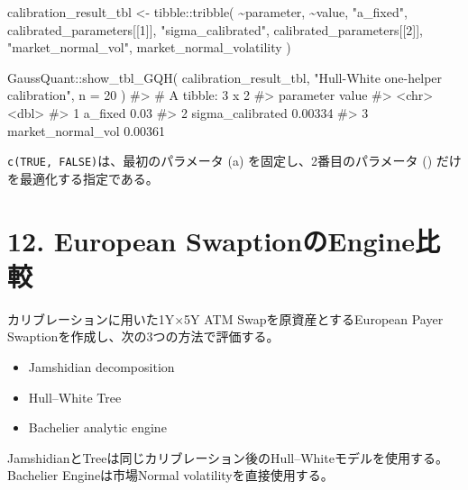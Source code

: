 \documentclass[
  letterpaper,
  DIV=11,
  numbers=noendperiod]{scrreprt}
\newenvironment{Shaded}{\begin{snugshade}}{\end{snugshade}}
\newcommand{\AttributeTok}[1]{\textcolor[rgb]{0.40,0.45,0.13}{#1}}
\newcommand{\CommentTok}[1]{\textcolor[rgb]{0.37,0.37,0.37}{#1}}
\newcommand{\DecValTok}[1]{\textcolor[rgb]{0.68,0.00,0.00}{#1}}
\newcommand{\FunctionTok}[1]{\textcolor[rgb]{0.28,0.35,0.67}{#1}}
\newcommand{\NormalTok}[1]{\textcolor[rgb]{0.00,0.23,0.31}{#1}}
\newcommand{\OtherTok}[1]{\textcolor[rgb]{0.00,0.23,0.31}{#1}}
\newcommand{\SpecialCharTok}[1]{\textcolor[rgb]{0.37,0.37,0.37}{#1}}
\newcommand{\StringTok}[1]{\textcolor[rgb]{0.13,0.47,0.30}{#1}}
\providecommand{\tightlist}{%
  \setlength{\itemsep}{0pt}\setlength{\parskip}{0pt}}
\begin{document}
\begin{Shaded}
\begin{Highlighting}[]
\NormalTok{calibration\_result\_tbl }\OtherTok{\textless{}{-}}\NormalTok{ tibble}\SpecialCharTok{::}\FunctionTok{tribble}\NormalTok{(}
  \SpecialCharTok{\textasciitilde{}}\NormalTok{parameter,             }\SpecialCharTok{\textasciitilde{}}\NormalTok{value,}
  \StringTok{"a\_fixed"}\NormalTok{,               calibrated\_parameters[[}\DecValTok{1}\NormalTok{]],}
  \StringTok{"sigma\_calibrated"}\NormalTok{,      calibrated\_parameters[[}\DecValTok{2}\NormalTok{]],}
  \StringTok{"market\_normal\_vol"}\NormalTok{,     market\_normal\_volatility}
\NormalTok{)}

\NormalTok{GaussQuant}\SpecialCharTok{::}\FunctionTok{show\_tbl\_GQH}\NormalTok{(}
\NormalTok{  calibration\_result\_tbl,}
  \StringTok{"Hull{-}White one{-}helper calibration"}\NormalTok{,}
  \AttributeTok{n =} \DecValTok{20}
\NormalTok{)}
\CommentTok{\#\textgreater{} \# A tibble: 3 x 2}
\CommentTok{\#\textgreater{}   parameter           value}
\CommentTok{\#\textgreater{}   \textless{}chr\textgreater{}               \textless{}dbl\textgreater{}}
\CommentTok{\#\textgreater{} 1 a\_fixed           0.03   }
\CommentTok{\#\textgreater{} 2 sigma\_calibrated  0.00334}
\CommentTok{\#\textgreater{} 3 market\_normal\_vol 0.00361}
\end{Highlighting}
\end{Shaded}

\texttt{c(TRUE,\ FALSE)}は、最初のパラメータ (a)
を固定し、2番目のパラメータ (\sigma) だけを最適化する指定である。

\section{12. European
SwaptionのEngine比較}\label{european-swaptionux306eengineux6bd4ux8f03}

カリブレーションに用いた1Y×5Y ATM Swapを原資産とするEuropean Payer
Swaptionを作成し、次の3つの方法で評価する。

\begin{itemize}
\tightlist
\item
  Jamshidian decomposition
\item
  Hull--White Tree
\item
  Bachelier analytic engine
\end{itemize}

JamshidianとTreeは同じカリブレーション後のHull--Whiteモデルを使用する。Bachelier
Engineは市場Normal volatilityを直接使用する。
\end{document}
